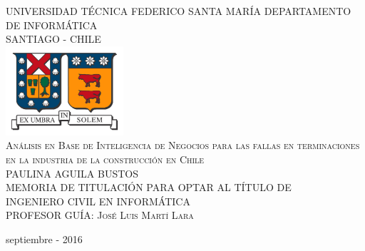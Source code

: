 \documentclass[letter,12pt,oneside]{report}
\begin{document}
\begin{titlepage}
\center 
\Large{UNIVERSIDAD TÉCNICA FEDERICO SANTA MARÍA}\vspace{-2mm}  %
\large{DEPARTAMENTO DE INFORMÁTICA}\\\vspace{-1mm} %
\normalsize{SANTIAGO - CHILE}\\\vspace{5mm} %
\includegraphics[height=125px]{images/ISOTIPO-Color.jpg}\\\vspace{15mm} %
\LARGE{\textsc{Análisis en Base de Inteligencia de Negocios para las fallas en terminaciones en la industria de la construcción en Chile}}\vspace{18mm}\\
\large{PAULINA AGUILA BUSTOS}\\\vspace{10mm}  %
\normalsize{MEMORIA DE TITULACIÓN PARA OPTAR AL TÍTULO DE\\ INGENIERO CIVIL EN INFORMÁTICA}\\\vspace{12mm}
\normalsize{\textsc{PROFESOR GUÍA: José Luis Martí Lara}}\\\vspace{13mm}

\large{septiembre - 2016}%
\vfill %
\end{titlepage}
\end{document}
